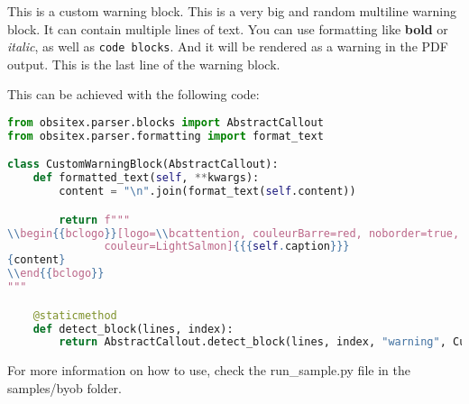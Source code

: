 \documentclass{article}
\begin{document}
\begin{bclogo}[logo=\bcattention, couleurBarre=red, noborder=true, 
               couleur=LightSalmon]{This is a custom warning block.}
This is a very big and random multiline warning block.
It can contain multiple lines of text.
You can use formatting like \textbf{bold} or \textit{italic}, as well as \texttt{code blocks}.
And it will be rendered as a warning in the PDF output.
This is the last line of the warning block.
\end{bclogo}


This can be achieved with the following code:



\begin{lstlisting}[language=Python,breaklines=true]
from obsitex.parser.blocks import AbstractCallout
from obsitex.parser.formatting import format_text

class CustomWarningBlock(AbstractCallout):
    def formatted_text(self, **kwargs):
        content = "\n".join(format_text(self.content))

        return f"""
\\begin{{bclogo}}[logo=\\bcattention, couleurBarre=red, noborder=true, 
               couleur=LightSalmon]{{{self.caption}}}
{content}
\\end{{bclogo}}
"""

    @staticmethod
    def detect_block(lines, index):
        return AbstractCallout.detect_block(lines, index, "warning", CustomWarningBlock)
\end{lstlisting}




For more information on how to use, check the run\_sample.py file in the samples/byob folder.
\end{document}
